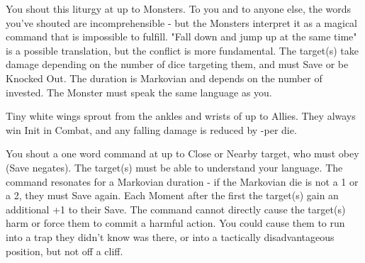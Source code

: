{\LITURGY [
  Name= Conflicting Command,
  Link=grey-lords-liturgy-conflicting command,
  Paradigm= Mind ,
  Save=  Y (negate Knocked Out effect) ,
  Duration= Markovian ,
  Counter=  n/a  ,
  Keywords= Splittable ,
  Target=   Close or Nearby Monsters
]



You shout this liturgy at up to \DICE Monsters.  To you and to anyone else, the words you've shouted are incomprehensible - but the Monsters interpret it as a magical command that is impossible to fulfill.  "Fall down and jump up at the same time" is a possible translation, but the conflict is more fundamental.  The target(s) take \DICE damage depending on the number of dice targeting them, and must Save or be Knocked Out.  The duration is Markovian and depends on the number of \DICE invested.  The Monster must speak the same language as you.

\LITURGY [
  Name= Duelists' Wings,
  Link=grey-lords-liturgy-duelists-wings,
  Paradigm= Biomancy ,
  Save=  0 ,
  Duration= Combat / \SUMDICE Minutes ,
  Counter=  n/a  ,
  Keywords= Splittable ,
  Target=   Close (touch) Allies or Self
]



Tiny white wings sprout from the ankles and wrists of up to \DICE Allies.  They always win Init in Combat, and any falling damage is reduced by -\DICE per die.

\LITURGY [
  Name= Resonating Command,
  Link=grey-lords-liturgy-resonating command,
  Paradigm= Mind ,
  Save=  Y (negates) ,
  Duration= Markovian ,
  Counter=  n/a  ,
  Keywords= Splittable ,
  Target=   Nearby creatures
]



You shout a one word command at up to \DICE Close or Nearby target, who must obey (Save negates).  The target(s) must be able to understand your language.  The command resonates for a Markovian duration - if the Markovian die is not a 1 or a 2, they must Save again.  Each Moment after the first the target(s) gain an additional +1 to their Save.  The command cannot directly cause the target(s) harm or force them to commit a harmful action.  You could cause them to run into a trap they didn't know was there, or into a tactically disadvantageous position, but not off a cliff.


\GOD[
Name=The Muses,
Link=small-god-the muses,
GodOf=Gods of Inspiration,
Holy=a nine-pointed star worn as an amulet or inscribed on a headband
]


}
